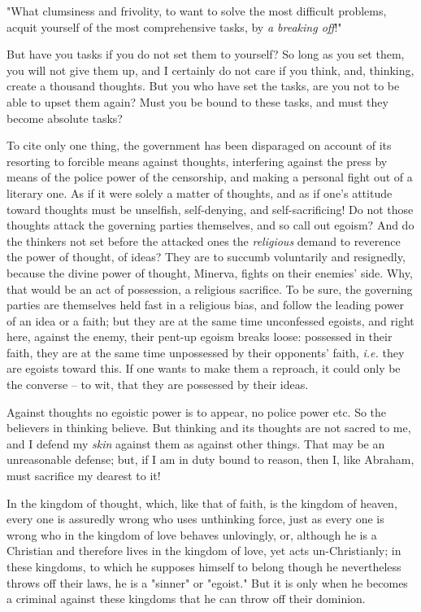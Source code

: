 \documentclass[a4paper]{book}
\begin{document}
"{}What clumsiness and frivolity, to want to solve the most difficult 
problems, acquit yourself of the most comprehensive tasks, by \textit{a 
breaking off}!"{}

But have you tasks if you do not set them to yourself? So long as you set 
them, you will not give them up, and I certainly do not care if you think, 
and, thinking, create a thousand thoughts. But you who have set the tasks, are 
you not to be able to upset them again? Must you be bound to these tasks, and 
must they become absolute tasks?

To cite only one thing, the government has been disparaged on account of its 
resorting to forcible means against thoughts, interfering against the press by 
means of the police power of the censorship, and making a personal fight out 
of a literary one. As if it were solely a matter of thoughts, and as if one's 
attitude toward thoughts must be unselfish, self-denying, and 
self-sacrificing! Do not those thoughts attack the governing parties 
themselves, and so call out egoism? And do the thinkers not set before the 
attacked ones the \textit{religious} demand to reverence the power of thought, 
of ideas? They are to succumb voluntarily and resignedly, because the divine 
power of thought, Minerva, fights on their enemies' side. Why, that would be 
an act of possession, a religious sacrifice. To be sure, the governing parties 
are themselves held fast in a religious bias, and follow the leading power of 
an idea or a faith; but they are at the same time unconfessed egoists, and 
right here, against the enemy, their pent-up egoism breaks loose: possessed in 
their faith, they are at the same time unpossessed by their opponents' faith, 
\textit{i.e.} they are egoists toward this. If one wants to make them a 
reproach, it could only be the converse -- to wit, that they are possessed by 
their ideas.

Against thoughts no egoistic power is to appear, no police power etc. So the 
believers in thinking believe. But thinking and its thoughts are not sacred to 
me, and I defend my \textit{skin} against them as against other things. That 
may be an unreasonable defense; but, if I am in duty bound to reason, then I, 
like Abraham, must sacrifice my dearest to it!

In the kingdom of thought, which, like that of faith, is the kingdom of 
heaven, every one is assuredly wrong who uses unthinking force, just as every 
one is wrong who in the kingdom of love behaves unlovingly, or, although he is 
a Christian and therefore lives in the kingdom of love, yet acts 
un-Christianly; in these kingdoms, to which he supposes himself to belong 
though he nevertheless throws off their laws, he is a "{}sinner"{} or 
"{}egoist."{} But it is only when he becomes a criminal against these kingdoms 
that he can throw off their dominion.
\end{document}

